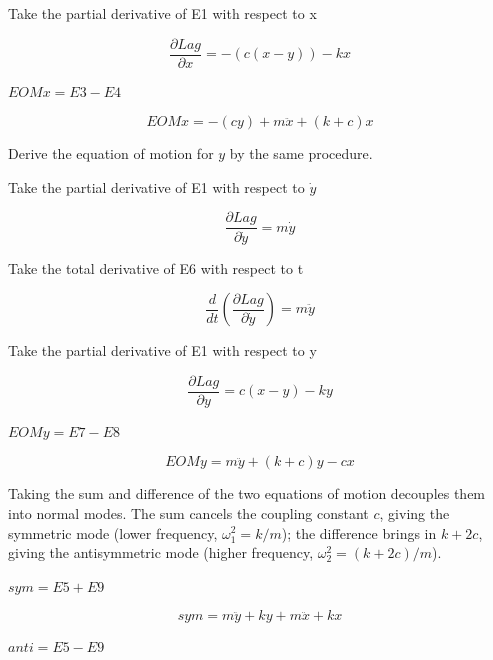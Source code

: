 \documentclass[dvipdfmx]{article}
\begin{document}
Take the partial derivative of E1 with respect to x

\begin{equation}
  \frac{\partial Lag}{\partial x} = -\left(c \left(x-y\right)\right)-k x
  \label{eq:E4}
\end{equation}

$EOMx = E3 - E4$

\begin{equation}
  EOMx = -\left(c y\right)+m \ddot{x}+\left(k+c\right) x
  \label{eq:E5}
\end{equation}

Derive the equation of motion for $y$ by the same procedure.

Take the partial derivative of E1 with respect to $\dot{y}$

\begin{equation}
  \frac{\partial Lag}{\partial \dot{y}} = m \dot{y}
  \label{eq:E6}
\end{equation}

Take the total derivative of E6 with respect to t

\begin{equation}
  \frac{d}{dt}\left(\frac{\partial Lag}{\partial \dot{y}}\right) = m \ddot{y}
  \label{eq:E7}
\end{equation}

Take the partial derivative of E1 with respect to y

\begin{equation}
  \frac{\partial Lag}{\partial y} = c \left(x-y\right)-k y
  \label{eq:E8}
\end{equation}

$EOMy = E7 - E8$

\begin{equation}
  EOMy = m \ddot{y}+\left(k+c\right) y-c x
  \label{eq:E9}
\end{equation}

Taking the sum and difference of the two equations of motion decouples them into normal modes. The sum cancels the coupling constant $c$, giving the symmetric mode (lower frequency, $\omega_1^2=k/m$); the difference brings in $k+2c$, giving the antisymmetric mode (higher frequency, $\omega_2^2=(k+2c)/m$).

$sym = E5 + E9$

\begin{equation}
  sym = m \ddot{y}+k y+m \ddot{x}+k x
  \label{eq:E10}
\end{equation}

$anti = E5 - E9$
\end{document}
